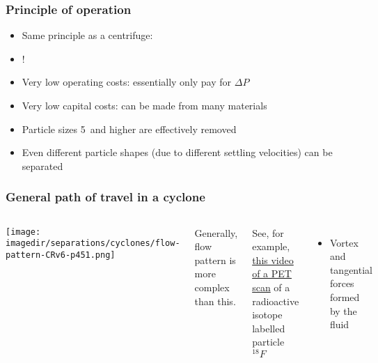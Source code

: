 \begin{frame}\frametitle{Principle of operation}
	\begin{itemize}
		\item	Same principle as a centrifuge: \textbf{{\color{myGreen}{density difference required}}}
		\item	{\color{myOrange}{No moving parts}}!
		\item	Very low operating costs: essentially only pay for $\Delta P$
		\item	Very low capital costs: can be made from many materials
		\item	Particle sizes 5\micron\,  and higher are effectively removed
		\item	Even different particle shapes (due to different settling velocities) can be separated
	\end{itemize}	
	
\end{frame}

\begin{frame}\frametitle{General path of travel in a cyclone {}}
	\begin{columns}[c]
			\begin{center}
				\texttt{[image: \\imagedir/separations/cyclones/flow-pattern-CRv6-p451.png]}
			\end{center}
			Generally, flow pattern is more complex than this. 
			
			\vspace{12pt}			
			See, for example, \href{http://www.youtube.com/watch?v=CWLARs\_dJO0}{this video of a PET scan} of a radioactive isotope labelled particle $^{18}F$
			
			\vspace{12pt}
			\begin{itemize}
				\item	Vortex and tangential forces formed by the fluid
			\end{itemize}
	\end{columns}
\end{frame}

